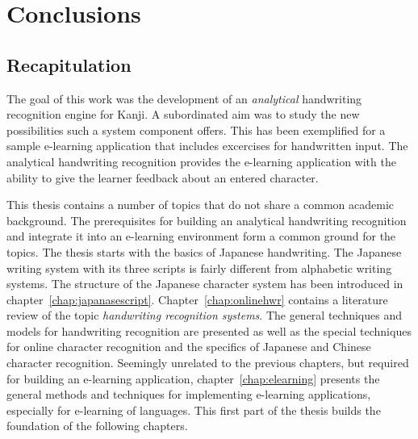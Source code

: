 \chapter{Conclusions}
\label{chap:conclusions}





\section{Recapitulation}
\label{sec:conclusion:recapitulation}

The goal of this work was the development of an \emph{analytical} handwriting
recognition engine for Kanji. A subordinated aim was to study the new 
possibilities such a system component offers. This has been exemplified for
a sample e-learning application that includes excercises for handwritten input.
The analytical handwriting recognition provides the e-learning 
application with the ability to give the learner feedback about an 
entered character.

This thesis contains a number of topics that do not share a common academic 
background. The prerequisites for building an analytical handwriting recognition
and integrate it into an e-learning environment form a common ground for the 
topics. The thesis starts with the basics of Japanese handwriting. The Japanese
writing system with its three scripts is fairly different from alphabetic 
writing systems. The structure of the Japanese character system has been 
introduced in chapter~\ref{chap:japanasescript}.
Chapter~\ref{chap:onlinehwr} contains a literature review of the topic 
\emph{handwriting recognition systems}. The general techniques and models
for handwriting recognition are presented as well as the special techniques
for online character recognition and the specifics of Japanese and Chinese 
character recognition.
Seemingly unrelated to the previous chapters, but required for building an
e-learning application, chapter~\ref{chap:elearning} presents the general
methods and techniques for implementing e-learning applications, especially 
for e-learning of languages. This first part of the thesis builds the 
foundation of the following chapters.

